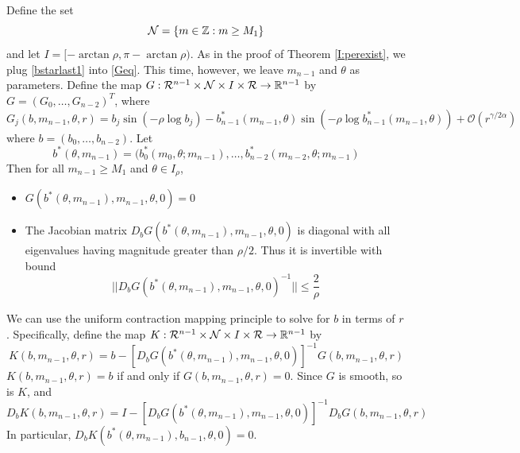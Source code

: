 \documentclass[thesis.tex]{subfiles}
\begin{document}
Define the set
\begin{equation}
\mathcal{N} = \{ m \in {\mathbb Z} : m \geq M_1 \}
\end{equation}
and let $I = [-\arctan \rho, \pi - \arctan \rho)$. As in the proof of Theorem \ref{I:perexist}, we plug \eqref{bstarlast1} into \eqref{Geq}. This time, however, we leave $m_{n-1}$ and $\theta$ as parameters. Define the map $G: \mathcal{R}^{n-1} \times \mathcal{N} \times I \times \mathcal{R} \rightarrow {\mathbb R}^{n-1}$ by $G = (G_0, \dots, G_{n-2})^T$, where 
\begin{equation*}
G_j(b, m_{n-1}, \theta, r) = b_j \sin \left( -\rho \log b_j \right) - b_{n-1}^*(m_{n-1}, \theta) \sin \left( -\rho \log b_{n-1}^*(m_{n-1}, \theta) \right) + \mathcal{O}(r^{\gamma / 2 \alpha})
\end{equation*}
where $b = (b_0, \dots, b_{n-2})$. Let
\begin{equation}\label{defbstar}
b^*(\theta, m_{n-1}) = 
( b_0^*(m_0, \theta; m_{n-1}), \dots, b_{n-2}^*(m_{n-2}, \theta; m_{n-1})
\end{equation}
Then for all $m_{n-1} \geq M_1$ and $\theta \in I_\rho$, 
\begin{itemize}
\item $G(b^*(\theta, m_{n-1}), m_{n-1}, \theta, 0) = 0$
\item The Jacobian matrix $D_b G(b^*(\theta, m_{n-1}), m_{n-1}, \theta, 0)$ is diagonal with all eigenvalues having magnitude greater than $\rho/2$. Thus it is invertible with bound 
\begin{equation}\label{DbGinvbound}
||D_b G(b^*(\theta, m_{n-1}), m_{n-1}, \theta, 0)^{-1}|| \leq \frac{2}{\rho}
\end{equation}
\end{itemize}

We can use the uniform contraction mapping principle to solve for $b$ in terms of $r$. Specifically, define the map $K: \mathcal{R}^{n-1} \times \mathcal{N} \times I \times \mathcal{R} \rightarrow {\mathbb R}^{n-1}$ by
\begin{equation}\label{defKb}
K(b, m_{n-1}, \theta, r) = b - [D_b G(b^*(\theta, m_{n-1}), m_{n-1}, \theta, 0)]^{-1} G(b, m_{n-1}, \theta, r)
\end{equation}
$K(b, m_{n-1}, \theta, r) = b$ if and only if $G(b, m_{n-1}, \theta, r) = 0$. Since $G$ is smooth, so is $K$, and 
\begin{equation}\label{DbK}
D_b K(b, m_{n-1}, \theta, r) = I - [D_b G(b^*(\theta, m_{n-1}), m_{n-1}, \theta, 0)]^{-1} D_b G(b, m_{n-1}, \theta, r)
\end{equation}
In particular, $D_b K(b^*(\theta, m_{n-1}), b_{n-1}, \theta, 0) = 0$.
\end{document}
